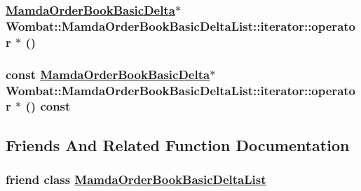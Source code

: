 \hypertarget{classWombat_1_1MamdaOrderBookBasicDeltaList_1_1iterator_3a40012e2b1f16993dddf355fedf813f}{
\subsubsection[operator $\ast$]{\setlength{\rightskip}{0pt plus 5cm}\hyperlink{classWombat_1_1MamdaOrderBookBasicDelta}{Mamda\-Order\-Book\-Basic\-Delta}$\ast$ Wombat::Mamda\-Order\-Book\-Basic\-Delta\-List::iterator::operator $\ast$ ()}}
\label{classWombat_1_1MamdaOrderBookBasicDeltaList_1_1iterator_3a40012e2b1f16993dddf355fedf813f}


\hypertarget{classWombat_1_1MamdaOrderBookBasicDeltaList_1_1iterator_2b68319ccb7b07e7606e06c5a603415c}{
\subsubsection[operator $\ast$]{\setlength{\rightskip}{0pt plus 5cm}const \hyperlink{classWombat_1_1MamdaOrderBookBasicDelta}{Mamda\-Order\-Book\-Basic\-Delta}$\ast$ Wombat::Mamda\-Order\-Book\-Basic\-Delta\-List::iterator::operator $\ast$ () const}}
\label{classWombat_1_1MamdaOrderBookBasicDeltaList_1_1iterator_2b68319ccb7b07e7606e06c5a603415c}




\subsection{Friends And Related Function Documentation}
\hypertarget{classWombat_1_1MamdaOrderBookBasicDeltaList_1_1iterator_5d3ae4bc128727ad59f67689abca3b92}{
\subsubsection[MamdaOrderBookBasicDeltaList]{\setlength{\rightskip}{0pt plus 5cm}friend class \hyperlink{classWombat_1_1MamdaOrderBookBasicDeltaList}{Mamda\-Order\-Book\-Basic\-Delta\-List}}}
\label{classWombat_1_1MamdaOrderBookBasicDeltaList_1_1iterator_5d3ae4bc128727ad59f67689abca3b92}




